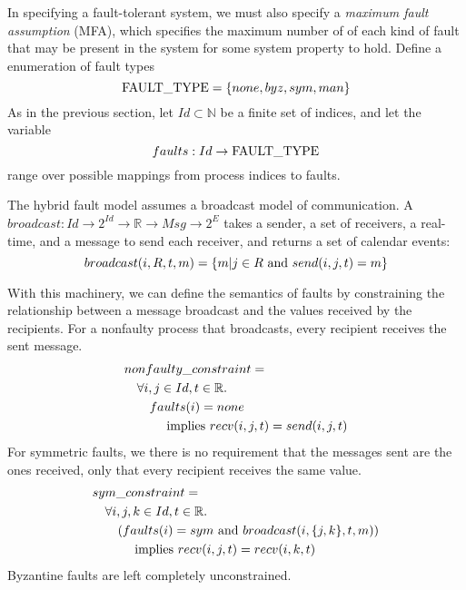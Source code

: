 \documentclass{llncs/llncs}
\newcommand{\lee}[1]{ } %
\newcommand{\lee}[1]{ {\color{blue}$<$lee: #1$>$} } %
\begin{document}
In specifying a fault-tolerant system, we must also specify a \emph{maximum fault assumption} (MFA), which specifies the maximum number of of each kind of fault that may be present in the system for some system property to hold. Define a enumeration of fault types $$\textnormal{FAULT\_TYPE} = \{none, byz, sym, man\}$$ As in the previous section, let $Id \subset \mathbb{N}$ be a finite set of indices, and let the variable $$faults: Id \rightarrow \textnormal{FAULT\_TYPE}$$ range over possible mappings from process indices to faults.

The hybrid fault model assumes a broadcast model of communication.
A $broadcast: Id \rightarrow 2^{Id} \rightarrow \mathbb{R} \rightarrow Msg \rightarrow 2^{E}$ takes a sender, a set of receivers, a real-time, and a message to send each receiver, and returns a set of calendar events:
$$broadcast(i, R, t, m) = \{m | j \in R \textnormal{ and } send(i, j, t) = m\}$$

\lee{msg in SAL is recv here}

With this machinery, we can define the semantics of faults by constraining the relationship between a message broadcast and the values received by the recipients. For a nonfaulty process that broadcasts, every recipient receives the sent message.
\begin{align*}
&nonfaulty\_constraint =\\
  &\quad \forall i, j \in Id, t \in \mathbb{R}.\\
  &\quad\quad faults(i) = none\\
  &\quad\quad\quad \textnormal{ implies } recv(i, j, t) = send(i, j, t)
\end{align*}
\noindent
For symmetric faults, we there is no requirement that the messages sent are the ones received, only that every recipient receives the same value.
\begin{align*}
&sym\_constraint =\\
  &\quad \forall i, j, k \in Id, t \in \mathbb{R}.\\
  &\quad\quad (faults(i) = sym \textnormal{ and } broadcast(i, \{j, k\}, t, m))\\
  &\quad\quad\quad \textnormal{ implies } recv(i, j, t) = recv(i, k, t)
\end{align*}
\noindent
Byzantine faults are left completely unconstrained.

\lee{Talk about how to define an MFA in the environment}
\end{document}
